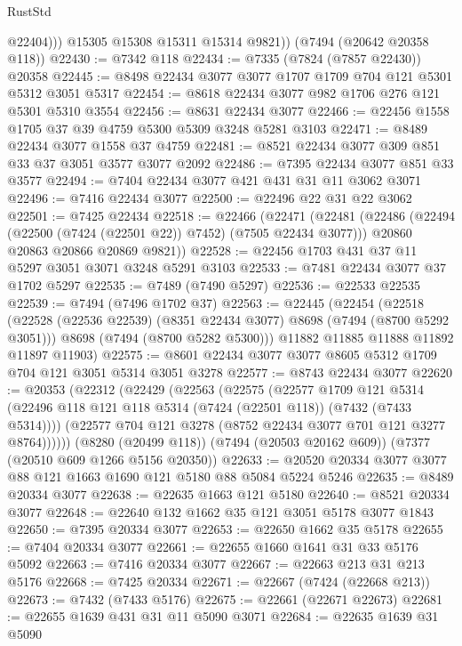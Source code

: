 \begin{lexlean}{RustStd}
\begin{coremodule}
              @22404)))
        @15305
        @15308
        @15311
        @15314
        @9821))
    (@7494 (@20642 @20358 @118))
@22430 := @7342 @118
@22434 := @7335 (@7824 (@7857 @22430)) @20358
@22445 := @8498 @22434 @3077 @3077 @1707 @1709 @704 @121 @5301 @5312 @3051 @5317
@22454 := @8618 @22434 @3077 @982 @1706 @276 @121 @5301 @5310 @3554
@22456 := @8631 @22434 @3077
@22466 := @22456 @1558 @1705 @37 @39 @4759 @5300 @5309 @3248 @5281 @3103
@22471 := @8489 @22434 @3077 @1558 @37 @4759
@22481 := @8521 @22434 @3077 @309 @851 @33 @37 @3051 @3577 @3077 @2092
@22486 := @7395 @22434 @3077 @851 @33 @3577
@22494 := @7404 @22434 @3077 @421 @431 @31 @11 @3062 @3071
@22496 := @7416 @22434 @3077
@22500 := @22496 @22 @31 @22 @3062
@22501 := @7425 @22434
@22518 := @22466
    (@22471
      (@22481
        (@22486 (@22494 (@22500 (@7424 (@22501 @22)) @7452) (@7505 @22434 @3077)))
        @20860
        @20863
        @20866
        @20869
        @9821))
@22528 := @22456 @1703 @431 @37 @11 @5297 @3051 @3071 @3248 @5291 @3103
@22533 := @7481 @22434 @3077 @37 @1702 @5297
@22535 := @7489 (@7490 @5297)
@22536 := @22533 @22535
@22539 := @7494 (@7496 @1702 @37)
@22563 := @22445
    (@22454
      (@22518
        (@22528 (@22536 @22539) (@8351 @22434 @3077) @8698 (@7494 (@8700 @5292 @3051)))
        @8698
        (@7494 (@8700 @5282 @5300)))
      @11882
      @11885
      @11888
      @11892
      @11897
      @11903)
@22575 := @8601 @22434 @3077 @3077 @8605 @5312 @1709 @704 @121 @3051 @5314 @3051 @3278
@22577 := @8743 @22434 @3077
@22620 := @20353
    (@22312
      (@22429
        (@22563
          (@22575
            (@22577
              @1709
              @121
              @5314
              (@22496 @118 @121 @118 @5314 (@7424 (@22501 @118)) (@7432 (@7433 @5314))))
            (@22577 @704 @121 @3278 (@8752 @22434 @3077 @701 @121 @3277 @8764))))))
    (@8280 (@20499 @118))
    (@7494 (@20503 @20162 @609))
    (@7377 (@20510 @609 @1266 @5156 @20350))
@22633 := @20520 @20334 @3077 @3077 @88 @121 @1663 @1690 @121 @5180 @88 @5084 @5224 @5246
@22635 := @8489 @20334 @3077
@22638 := @22635 @1663 @121 @5180
@22640 := @8521 @20334 @3077
@22648 := @22640 @132 @1662 @35 @121 @3051 @5178 @3077 @1843
@22650 := @7395 @20334 @3077
@22653 := @22650 @1662 @35 @5178
@22655 := @7404 @20334 @3077
@22661 := @22655 @1660 @1641 @31 @33 @5176 @5092
@22663 := @7416 @20334 @3077
@22667 := @22663 @213 @31 @213 @5176
@22668 := @7425 @20334
@22671 := @22667 (@7424 (@22668 @213))
@22673 := @7432 (@7433 @5176)
@22675 := @22661 (@22671 @22673)
@22681 := @22655 @1639 @431 @31 @11 @5090 @3071
@22684 := @22635 @1639 @31 @5090

\end{coremodule}
\end{lexlean}
